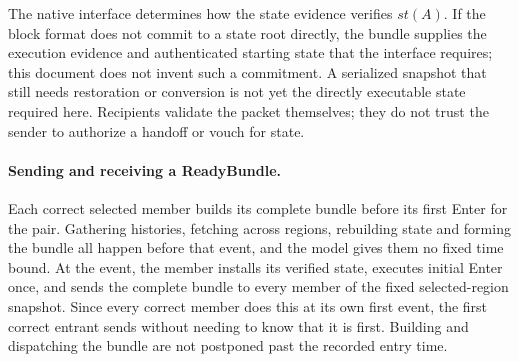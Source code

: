 \documentclass[11pt,a4paper]{article}
\begin{document}
The native interface determines how the state evidence verifies $\mathit{st}(A)$.
If the block format does not commit to a state root directly, the bundle
supplies the execution evidence and authenticated starting state that the
interface requires; this document does not invent such a commitment. A
serialized snapshot that still needs restoration or conversion is not yet
the directly executable state required here. Recipients validate the
packet themselves; they do not trust the sender to authorize a handoff or
vouch for state.

\paragraph{Sending and receiving a ReadyBundle.}
Each correct selected member builds its complete bundle before its first
Enter for the pair. Gathering histories, fetching across
regions, rebuilding state and forming the bundle all happen before that
event, and the model gives them no fixed time bound. At the event, the
member installs its verified state, executes initial Enter once, and
sends the complete bundle to every member of the fixed selected-region
snapshot. Since every correct member does this at its own first event,
the first correct entrant sends without needing to know that it is first.
Building and dispatching the bundle are not postponed past the recorded
entry time.
\end{document}
